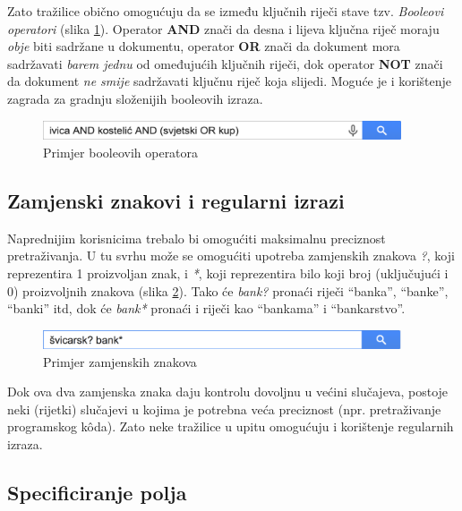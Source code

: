 \documentclass[a4paper,twoside,12pt]{scrreprt}
\begin{document}
Zato tražilice obično omogućuju da se između ključnih riječi stave tzv. \textit{Booleovi operatori} (slika \ref{boolean}). Operator \textbf{AND} znači da desna i lijeva ključna riječ moraju \textit{obje} biti sadržane u dokumentu, operator \textbf{OR} znači da dokument mora sadržavati \textit{barem jednu} od omeđujućih ključnih riječi, dok operator \textbf{NOT} znači da dokument \textit{ne smije} sadržavati ključnu riječ koja slijedi. Moguće je i korištenje zagrada za gradnju složenijih booleovih izraza.

\begin{figure}[H]
  \centering
  \includegraphics[width=300pt]{boolean}
  \caption{Primjer booleovih operatora}
  \label{boolean}
\end{figure}

\subsection{Zamjenski znakovi i regularni izrazi}

Naprednijim korisnicima trebalo bi omogućiti maksimalnu preciznost pretraživanja. U tu svrhu može se omogućiti upotreba zamjenskih znakova \textit{?}, koji reprezentira 1 proizvoljan znak, i \textit{*}, koji reprezentira bilo koji broj (uključujući i 0) proizvoljnih znakova (slika \ref{wildcards}). Tako će \textit{bank?} pronaći riječi ``banka'', ``banke'', ``banki'' itd, dok će \textit{bank*} pronaći i riječi kao ``bankama'' i ``bankarstvo''.

\begin{figure}[H]
  \centering
  \includegraphics[width=300pt]{wildcards}
  \caption{Primjer zamjenskih znakova}
  \label{wildcards}
\end{figure}

Dok ova dva zamjenska znaka daju kontrolu dovoljnu u većini slučajeva, postoje neki (rijetki) slučajevi u kojima je potrebna veća preciznost (npr. pretraživanje programskog kôda). Zato neke tražilice u upitu omogućuju i korištenje regularnih izraza.

\subsection{Specificiranje polja}
\end{document}
